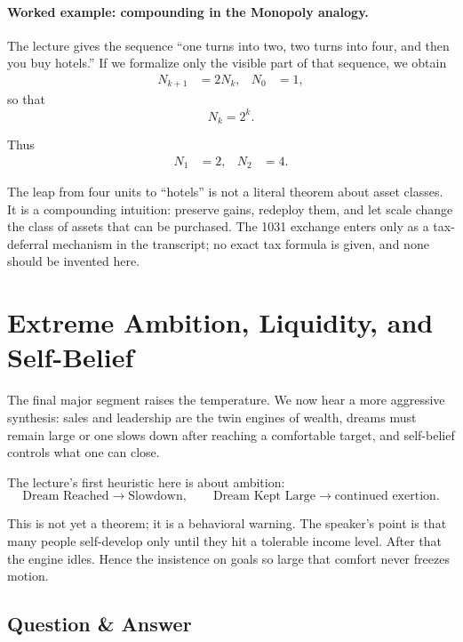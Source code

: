 \paragraph{Worked example: compounding in the Monopoly analogy.}
The lecture gives the sequence ``one turns into two, two turns into four, and then you buy hotels.'' If we formalize only the visible part of that sequence, we obtain
\begin{align}
N_{k+1} &= 2N_k, &
N_0 &= 1,
\end{align}
so that
\begin{equation}
N_k = 2^k.
\end{equation}

Thus
\begin{align}
N_1 &= 2, &
N_2 &= 4.
\end{align}

The leap from four units to ``hotels'' is not a literal theorem about asset classes. It is a compounding intuition: preserve gains, redeploy them, and let scale change the class of assets that can be purchased. The 1031 exchange enters only as a tax-deferral mechanism in the transcript; no exact tax formula is given, and none should be invented here.

\section{Extreme Ambition, Liquidity, and Self-Belief}

The final major segment raises the temperature. We now hear a more aggressive synthesis: sales and leadership are the twin engines of wealth, dreams must remain large or one slows down after reaching a comfortable target, and self-belief controls what one can close.

The lecture's first heuristic here is about ambition:
\begin{equation}
\text{Dream Reached} \to \text{Slowdown},
\qquad
\text{Dream Kept Large} \to \text{continued exertion}.
\end{equation}

This is not yet a theorem; it is a behavioral warning. The speaker's point is that many people self-develop only until they hit a tolerable income level. After that the engine idles. Hence the insistence on goals so large that comfort never freezes motion.

\subsection{Question \& Answer}

